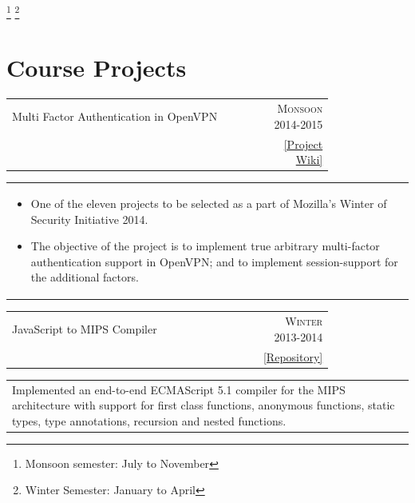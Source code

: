 \documentclass[a4paper,10pt]{article} %
\newcommand{\cproject}[5]{
    \begin{tabular}{p{0.80\linewidth}r}
        \textcolor{NavyBlue}{#2} & \multicolumn{1}{m{4cm}}{\raggedleft \textsc{#1}}\\
        #3 & #4
    \end{tabular}
    \begin{tabular}{p{\linewidth}}
    \vspace{-0.3cm}
        \footnotesize{#5}
    \end{tabular}
    \vspace{-0.5cm}
}
\newcommand{\scproject}[5]{
    \begin{tabular}{p{0.80\linewidth}r}
        \textcolor{NavyBlue}{#2} & \multicolumn{1}{m{4cm}}{\raggedleft \textsc{#1}}\\
        #3 & #4
    \end{tabular}
    \begin{tabular}{p{\linewidth}}
    \vspace{-0.3cm}
        \footnotesize{#5}
    \end{tabular}
    \vspace{-0.3cm}
}
\begin{document}
\let\thefootnote\relax\footnote{Monsoon semester: July to November}
\let\thefootnote\relax\footnote{Winter Semester: January to April}
\section{Course Projects}

\cproject
    {Monsoon 2014-2015}
    {Multi Factor Authentication in OpenVPN}
    {\textsc{\raggedright Mozilla Winter of Security}, Guillaume Destuynder and Professor Dheeraj Sanghi}
    {\href{https://wiki.mozilla.org/Security/Mentorships/MWoS/2014/OpenVPN\_MFA}{ \footnotesize{[Project Wiki]}} }
    {
      \begin{itemize}[leftmargin=0.5cm]
          \item One of the eleven projects to be selected as a part of Mozilla's Winter of Security Initiative 2014.
          \item The objective of the project is to implement true arbitrary multi-factor authentication support in
              OpenVPN; and to implement session-support for the additional factors.
      \end{itemize}
    }

\scproject
    {Winter 2013-2014}
    {JavaScript to MIPS Compiler}
    {\textsc{\raggedright Compilers}, Professor Subhajit Roy}
    { \href{https://github.com/srijanshetty/javascript-compiler} { \footnotesize{[Repository]}} }
    {
          Implemented an end-to-end ECMAScript 5.1 compiler for the MIPS architecture with support for first class
          functions, anonymous functions, static types, type annotations, recursion and nested functions.
    }
\end{document}
